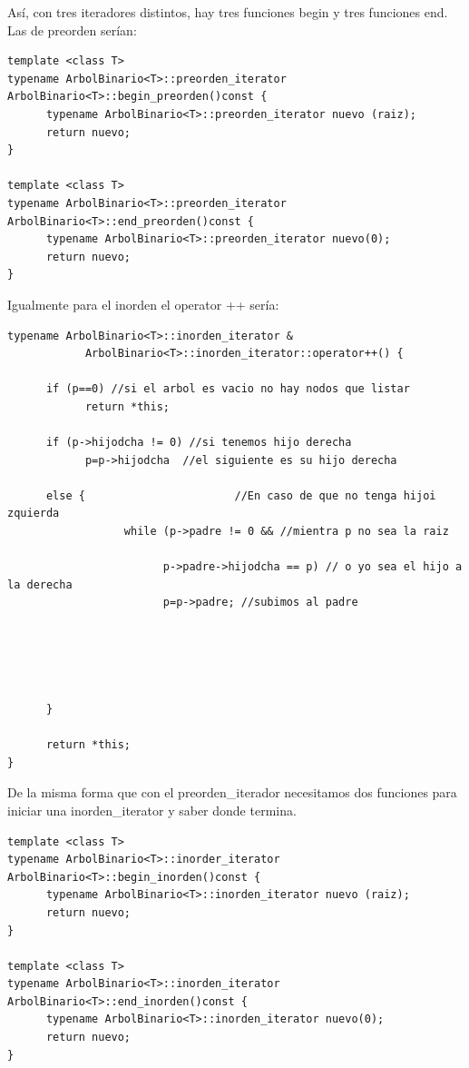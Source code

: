 \documentclass[10pt,a4paper,spanish]{report}
\begin{document}
\noindent
Así, con tres iteradores distintos, hay tres funciones begin y tres funciones end. Las de preorden serían:

\begin{verbatim}
template <class T>
typename ArbolBinario<T>::preorden_iterator ArbolBinario<T>::begin_preorden()const {
      typename ArbolBinario<T>::preorden_iterator nuevo (raiz);
      return nuevo;
}

template <class T>
typename ArbolBinario<T>::preorden_iterator ArbolBinario<T>::end_preorden()const {
      typename ArbolBinario<T>::preorden_iterator nuevo(0);
      return nuevo;
}
\end{verbatim}
Igualmente para el inorden el operator ++ sería:
\begin{verbatim}
typename ArbolBinario<T>::inorden_iterator & 
            ArbolBinario<T>::inorden_iterator::operator++() {

      if (p==0) //si el arbol es vacio no hay nodos que listar
            return *this;

      if (p->hijodcha != 0) //si tenemos hijo derecha
            p=p->hijodcha  //el siguiente es su hijo derecha

      else {                       //En caso de que no tenga hijoi zquierda
                  while (p->padre != 0 && //mientra p no sea la raiz
                    
                        p->padre->hijodcha == p) // o yo sea el hijo a la derecha
                        p=p->padre; //subimos al padre
                        

                 
                  
            
      }

      return *this;
}
\end{verbatim}
De la misma forma que con el preorden\_iterador necesitamos dos funciones para iniciar una inorden\_iterator y saber donde termina.

\begin{verbatim}
template <class T>
typename ArbolBinario<T>::inorder_iterator ArbolBinario<T>::begin_inorden()const {
      typename ArbolBinario<T>::inorden_iterator nuevo (raiz);
      return nuevo;
}

template <class T>
typename ArbolBinario<T>::inorden_iterator ArbolBinario<T>::end_inorden()const {
      typename ArbolBinario<T>::inorden_iterator nuevo(0);
      return nuevo;
}
\end{verbatim}
\end{document}
